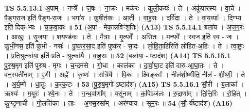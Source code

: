 \documentclass[17pt]{extarticle}
\begin{document}
                                \textbf{ TS 5.5.13.1} \newline
                  अ॒पाम् । नप्त्रे᳚ । ज॒षः । ना॒क्रः । मक॑रः । कु॒ली॒कयः॑ । ते । अकू॑पारस्य । वा॒चे । पै॒ङ्ग॒रा॒ज इति॑ पैङ्ग-रा॒जः । भगा॑य । कु॒षीत॑कः । आ॒ती । वा॒ह॒सः । दर्वि॑दा । ते । वा॒य॒व्याः᳚ । दि॒ग्भ्य इति॑ दिक्-भ्यः । च॒क्र॒वा॒कः ॥ \textbf{  51} \newline
                  \newline
                      (अ॒पा - मेका॒न्नविꣳ॑श॒तिः)  \textbf{(A13)} \newline \newline
                                \textbf{ TS 5.5.14.1} \newline
                  बला॑य । अ॒ज॒ग॒रः । आ॒खुः । सृ॒ज॒या । श॒यण्ड॑कः । ते । मै॒त्राः । मृ॒त्यवे᳚ । अ॒सि॒तः । म॒न्यवे᳚ । स्व॒ज इति॑ स्व - जः । कु॒भीं॒नस॒ इति॑ कुंभी - नसः॑ । पु॒ष्क॒र॒सा॒द इति॑ पुष्कर - सा॒दः । लो॒हि॒ता॒हिरिति॑ लोहित-अ॒हिः । ते । त्वा॒ष्ट्राः । प्र॒ति॒श्रुत्का॑या॒ इति॑ प्रति - श्रुत्का॑यै । वा॒ह॒सः ॥ \textbf{  52 } \newline
                  \newline
                      (बला॑या॒ - ष्टाद॑श)  \textbf{(A14)} \newline \newline
                                \textbf{ TS 5.5.15.1} \newline
                  पु॒रु॒ष॒मृ॒ग इति॑ पुरुष - मृ॒गः । च॒न्द्रम॑से । गो॒धा । काल॑का । दा॒र्वा॒घा॒ट इति॑ दारु-आ॒घा॒तः । ते । वन॒स्पती॑नाम् । ए॒णी । अह्ने᳚ । कृष्णः॑ । रात्रि॑यै । पि॒कः । क्ष्विङ्काः᳚ । नील॑शी॒र्ष्णीति॒ नील॑ - शी॒र्ष्णी॒ । ते । अ॒र्य॒म्णे । धा॒तुः । क॒त्क॒टः ॥ \textbf{  53} \newline
                  \newline
                      (पु॒रु॒ष॒मृ॒गो᳚-ऽष्टाद॑श)  \textbf{(A15)} \newline \newline
                                \textbf{ TS 5.5.16.1} \newline
                  सौ॒री । ब॒लाका᳚ । ऋश्यः॑ । म॒यूरः॑ । श्ये॒नः । ते । ग॒न्ध॒र्वाणा᳚म् । वसू॑नाम् । क॒पिञ्ज॑लः । रु॒द्राणा᳚म् । ति॒त्ति॒रिः । रो॒हित् । कु॒ण्डृ॒णाची᳚ । गो॒लत्ति॑का । ताः । अ॒फ्स॒रसा᳚म् । अर॑ण्याय । सृ॒म॒रः ॥ \textbf{  54 } \newline
                  \newline
                      (सौ॒-र्य॑ष्टाद॑श)  \textbf{(A16)} \newline \newline
\end{document}
